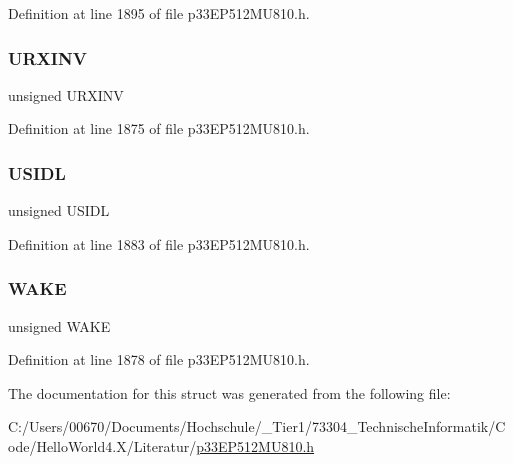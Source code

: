 Definition at line 1895 of file p33\+E\+P512\+M\+U810.\+h.

\mbox{\label{structtag_u3_m_o_d_e_b_i_t_s_ab6387939f9a8bc487f0eab6e20afd53d}} 
\subsubsection{\texorpdfstring{U\+R\+X\+I\+NV}{URXINV}}
{\footnotesize\ttfamily unsigned U\+R\+X\+I\+NV}



Definition at line 1875 of file p33\+E\+P512\+M\+U810.\+h.

\mbox{\label{structtag_u3_m_o_d_e_b_i_t_s_a94d25c6c9271a4ab4f450319e34e2a00}} 
\subsubsection{\texorpdfstring{U\+S\+I\+DL}{USIDL}}
{\footnotesize\ttfamily unsigned U\+S\+I\+DL}



Definition at line 1883 of file p33\+E\+P512\+M\+U810.\+h.

\mbox{\label{structtag_u3_m_o_d_e_b_i_t_s_a364c8b1b2c2f66b23dd1093ced3e20dd}} 
\subsubsection{\texorpdfstring{W\+A\+KE}{WAKE}}
{\footnotesize\ttfamily unsigned W\+A\+KE}



Definition at line 1878 of file p33\+E\+P512\+M\+U810.\+h.



The documentation for this struct was generated from the following file\+:\begin{DoxyCompactItemize}
\item 
C\+:/\+Users/00670/\+Documents/\+Hochschule/\+\_\+\+Tier1/73304\+\_\+\+Technische\+Informatik/\+Code/\+Hello\+World4.\+X/\+Literatur/\hyperlink{p33_e_p512_m_u810_8h}{p33\+E\+P512\+M\+U810.\+h}\end{DoxyCompactItemize}
